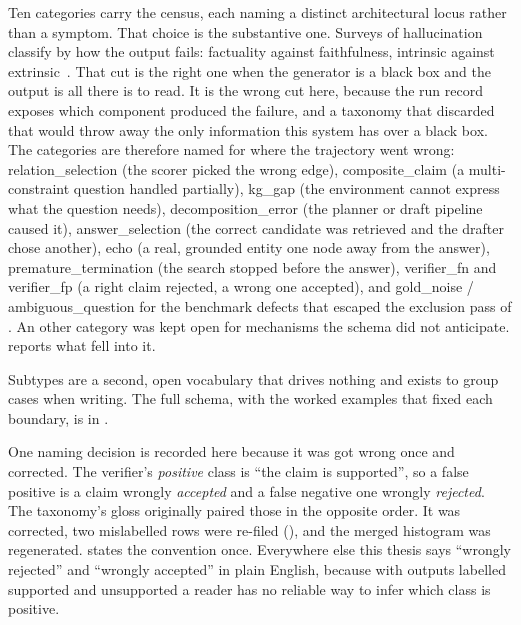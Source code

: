 Ten categories carry the census, each naming a distinct architectural
locus rather than a symptom. That choice is the
substantive one. Surveys of hallucination classify by how the output fails:
factuality against faithfulness, intrinsic against
extrinsic~\cite{huang2025survey}. That cut is the right one when the generator
is a black box and the output is all there is to read. It is the wrong cut here,
because the run record exposes which component produced the failure, and a
taxonomy that discarded that would throw away the only information this system
has over a black box. The categories are therefore named for where the
trajectory went wrong: \textsf{relation\_selection} (the scorer picked the wrong
edge), \textsf{composite\_claim} (a multi-constraint question handled
partially), \textsf{kg\_gap} (the environment cannot express what the question
needs), \textsf{decomposition\_error} (the planner or draft pipeline caused it),
\textsf{answer\_selection} (the correct candidate was retrieved and the drafter
chose another), \textsf{echo} (a real, grounded entity one node away from the
answer), \textsf{premature\_termination} (the search stopped before the answer),
\textsf{verifier\_fn} and \textsf{verifier\_fp} (a right claim rejected, a wrong
one accepted), and \textsf{gold\_noise} / \textsf{ambiguous\_question} for the
benchmark defects that escaped the exclusion pass of . An
\textsf{other} category was kept open for mechanisms the schema did not
anticipate.  reports what fell into it.

Subtypes are a second, open vocabulary that drives nothing and exists to group
cases when writing. The full schema, with the worked examples that fixed each
boundary, is  in .

One naming decision is recorded here because it was got wrong once and
corrected. The verifier's \emph{positive} class is ``the claim is supported'',
so a false positive is a claim wrongly \emph{accepted} and a false negative one
wrongly \emph{rejected}. The taxonomy's gloss originally paired those in the
opposite order. It was corrected, two mislabelled rows were re-filed
(), and the merged histogram was
regenerated.  states the convention once. Everywhere else
this thesis says ``wrongly rejected'' and ``wrongly accepted'' in plain English,
because with outputs labelled \textsf{supported} and \textsf{unsupported} a
reader has no reliable way to infer which class is positive.


